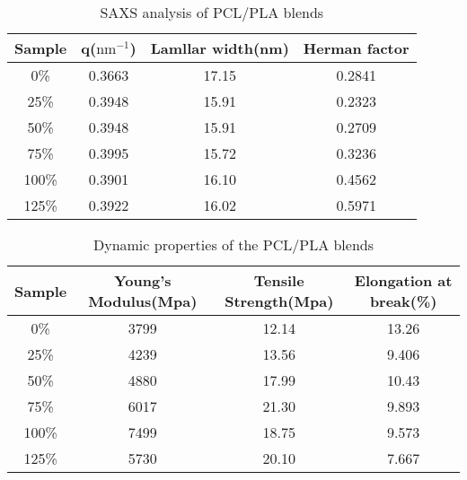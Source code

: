 \documentclass{Head}
\begin{document}
\begin{table}
    \centering
    \caption{SAXS analysis of PCL/PLA blends}
    \begin{tabular}{cccc}
        \toprule
        Sample & \textbf{q}($\mathrm{nm^{-1}}$) & Lamllar width(nm) & Herman factor \\
        \midrule
        0\%    & 0.3663                         & 17.15             & 0.2841        \\
        25\%   & 0.3948                         & 15.91             & 0.2323        \\
        50\%   & 0.3948                         & 15.91             & 0.2709        \\
        75\%   & 0.3995                         & 15.72             & 0.3236        \\
        100\%  & 0.3901                         & 16.10             & 0.4562        \\
        125\%  & 0.3922                         & 16.02             & 0.5971        \\
        \bottomrule
    \end{tabular}
\end{table}
\begin{table}
    \centering
    \caption{Dynamic properties of the PCL/PLA blends}
    \begin{tabular}{cccc}
        \toprule
        Sample & Young's Modulus(Mpa) & Tensile Strength(Mpa) & Elongation at break(\%) \\
        \midrule
        0\%    & 3799                 & 12.14                 & 13.26                   \\
        25\%   & 4239                 & 13.56                 & 9.406                   \\
        50\%   & 4880                 & 17.99                 & 10.43                   \\
        75\%   & 6017                 & 21.30                 & 9.893                   \\
        100\%  & 7499                 & 18.75                 & 9.573                   \\
        125\%  & 5730                 & 20.10                 & 7.667                   \\
        \bottomrule
    \end{tabular}
\end{table}
\end{document}
